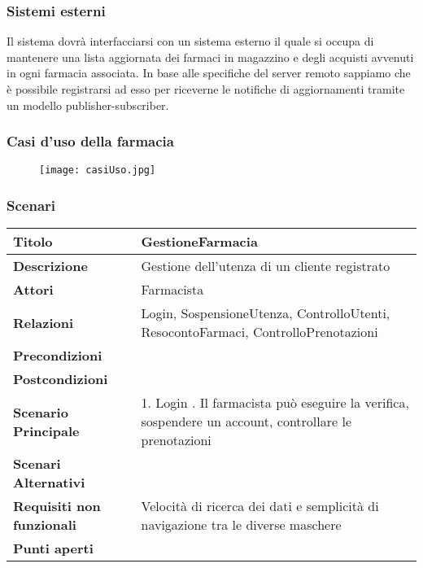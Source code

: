 \subsubsection{Sistemi esterni}
\label{sec:esterno}

Il sistema dovrà interfacciarsi con un sistema esterno il quale si occupa di
mantenere una lista aggiornata dei farmaci in magazzino e degli
acquisti avvenuti in ogni farmacia associata.
In base alle specifiche del server remoto sappiamo che è possibile registrarsi
ad esso per riceverne le notifiche di aggiornamenti tramite un modello
publisher-subscriber.


\newpage %
\subsubsection{Casi d'uso della farmacia}

\begin{figure}[h!]
  \begin{center}
      \texttt{[image: casiUso.jpg]}
  \end{center}
\end{figure}

\newpage %
\subsubsection{Scenari}
\hfill \break

\begin{tabular} {|P{4.5cm}|P{12.5cm}|}
\hline  
  \textbf{Titolo} & GestioneFarmacia \\
\hline
  \textbf{Descrizione} & Gestione dell'utenza di un cliente registrato \\
\hline
  \textbf{Attori} & Farmacista\\
\hline
  \textbf{Relazioni} & Login, SospensioneUtenza, ControlloUtenti,
  ResocontoFarmaci, ControlloPrenotazioni\\
\hline
  \textbf{Precondizioni} & \\
\hline
  \textbf{Postcondizioni} & \\
\hline
  \textbf{Scenario Principale} & 1. Login . Il farmacista può
  eseguire la verifica, sospendere un account, controllare le prenotazioni \\
\hline
  \textbf{Scenari Alternativi} &\\
\hline
  \textbf{Requisiti non funzionali} & Velocità di ricerca dei dati e semplicità
  di navigazione tra le diverse maschere\\
\hline
  \textbf{Punti aperti} &\\
\hline
\end{tabular}
\hfill
\break

